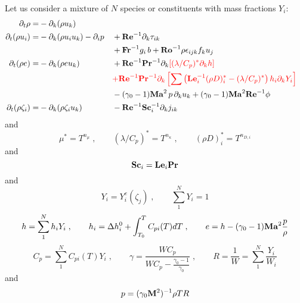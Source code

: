 Let us consider a mixture of $N$ species or constituents with mass fractions $Y_i$:
\begin{subequations}
  \begin{align}
    \partial_t \rho       =& -\partial_k (\rho u_k)                                                \\
    \partial_t (\rho u_i) =& -\partial_k (\rho u_i u_k )-\partial_i p
    && +\mathrm{\bf Re}^{-1}\partial_k \tau_{ik}                                                    \nonumber\\
    & && +\mathrm{\bf Fr}^{-1} g_i\,b +\mathrm{\bf Ro}^{-1}\rho\epsilon_{ijk} f_ku_j                                     \\
    \partial_t (\rho e)   =& -\partial_k (\rho e u_k )
    && +\mathrm{\bf Re}^{-1}\mathrm{\bf Pr}^{-1}\partial_k\color{red}{\left[(\lambda/C_p)^{*}\partial_kh\right]}\nonumber\\
    & && \color{red}{+\mathrm{\bf Re}^{-1}\mathrm{\bf Pr}^{-1} \partial_k\left[\sum\left(\mathrm{\bf Le}_i^{-1}(\rho D)_i^*
    -(\lambda/C_p)^*\right)h_i \partial_k  Y_i\right]}                                  \nonumber\\
    & && -(\gamma_0-1)\mathrm{\bf Ma}^2\,p\, \partial_k u_k  + (\gamma_0-1)\mathrm{\bf Ma}^2\mathrm{\bf Re}^{-1}\phi                 \\
    \partial_t (\rho \zeta_i)=& -\partial_k (\rho \zeta_i u_k)
    && -\mathrm{\bf Re}^{-1}\mathrm{\bf Sc}_i^{-1} \partial_k j_{ik}
  \end{align}
\end{subequations}
and
\begin{equation}
  \mu^{*} = T^{n_\mu}\;,\qquad (\lambda/C_p)^{*} = T^{n_\kappa} \;,\qquad (\rho
  D)_i^{*} = T^{n_{D,i}}
\end{equation}
and
\begin{equation}
  \mathrm{\bf Sc}_i = \mathrm{\bf Le}_i \mathrm{\bf Pr}
\end{equation}
and
\begin{equation}
  Y_i = Y^e_i(\zeta_j)\;, \qquad \sum^N_1 Y_i=1
\end{equation}
\begin{equation}
  h = \sum^N_1 h_{i} Y_i \;,\qquad h_{i} = \Delta h^0_i + \int^{T}_{T_0}
  C_{pi}(T) dT\;,\qquad e = h - (\gamma_0-1)\mathrm{\bf Ma}^2\frac{p}{\rho}
\end{equation}
\begin{equation}
  C_p = \sum^N_1 C_{pi}(T) Y_i\;,\qquad
  \gamma = \frac{W C_p}{W C_p-\frac{\gamma_0-1}{\gamma_0}} \;,\qquad
  R=\frac{1}{W} = \sum^N_1 \frac{Y_i}{W_i}
\end{equation}
and
\begin{equation}
  p = (\gamma_0 \mathrm{\bf M}^2)^{-1}\rho T R
\end{equation}
